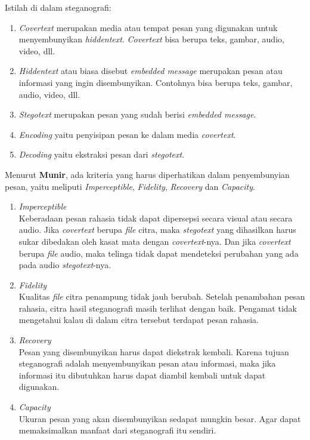 	Istilah di dalam steganografi:
	\begin{enumerate}
		\item \emph{Covertext} merupakan media atau tempat pesan yang digunakan untuk menyembunyikan \emph{hiddentext}. \emph{Covertext} bisa berupa teks, gambar, audio, video, dll.
		\item \emph{Hiddentext}	atau biasa disebut \emph{embedded message} merupakan pesan atau informasi yang ingin disembunyikan. Contohnya bisa berupa teks, gambar, audio, video, dll.
		\item \emph{Stegotext} merupakan pesan yang sudah berisi \emph{embedded message}.
		\item \emph{Encoding} yaitu penyisipan pesan ke dalam media \emph{covertext}.
		\item \emph{Decoding} yaitu ekstraksi pesan dari \emph{stegotext}.
	\end{enumerate}
	
	Menurut \textbf{Munir}, ada kriteria yang harus diperhatikan dalam penyembunyian pesan, yaitu meliputi \emph{Imperceptible}, \emph{Fidelity}, \emph{Recovery} dan \emph{Capacity}.
	\begin{enumerate}
		\item \emph{Imperceptible}\\ 
		Keberadaan pesan rahasia tidak dapat dipersepsi secara visual atau secara audio. Jika \emph{covertext} berupa \emph{file} citra, maka \emph{stegotext} yang dihasilkan harus sukar dibedakan oleh kasat mata dengan \emph{covertext}-nya. Dan jika \emph{covertext} berupa \emph{file} audio, maka telinga tidak dapat mendeteksi perubahan yang ada pada audio \emph{stegotext}-nya. 
		\item \emph{Fidelity}\\
		Kualitas \emph{file} citra penampung tidak jauh berubah. Setelah penambahan pesan rahasia, citra hasil steganografi masih terlihat dengan baik. Pengamat tidak mengetahui kalau di dalam citra tersebut terdapat pesan rahasia.
		\item \emph{Recovery}\\
		Pesan yang disembunyikan harus dapat diekstrak kembali. Karena tujuan steganografi adalah menyembunyikan pesan atau informasi, maka jika informasi itu dibutuhkan harus dapat diambil kembali untuk dapat digunakan.
		\item \emph{Capacity}\\
		Ukuran pesan yang akan disembunyikan sedapat mungkin besar. Agar dapat memaksimalkan manfaat dari steganografi itu sendiri. \cite{munir}
	\end{enumerate}
	
